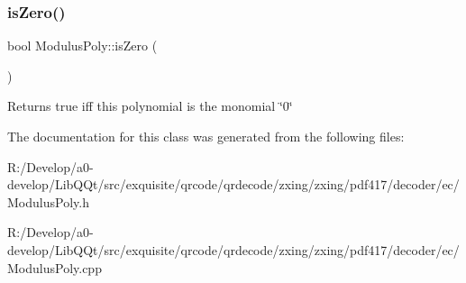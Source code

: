 \subsubsection{\texorpdfstring{is\+Zero()}{isZero()}}
{\footnotesize\ttfamily bool Modulus\+Poly\+::is\+Zero (\begin{DoxyParamCaption}{ }\end{DoxyParamCaption})}

\begin{DoxyReturn}{Returns}
true iff this polynomial is the monomial \char`\"{}0\char`\"{} 
\end{DoxyReturn}


The documentation for this class was generated from the following files\+:\begin{DoxyCompactItemize}
\item 
R\+:/\+Develop/a0-\/develop/\+Lib\+Q\+Qt/src/exquisite/qrcode/qrdecode/zxing/zxing/pdf417/decoder/ec/Modulus\+Poly.\+h\item 
R\+:/\+Develop/a0-\/develop/\+Lib\+Q\+Qt/src/exquisite/qrcode/qrdecode/zxing/zxing/pdf417/decoder/ec/Modulus\+Poly.\+cpp\end{DoxyCompactItemize}
